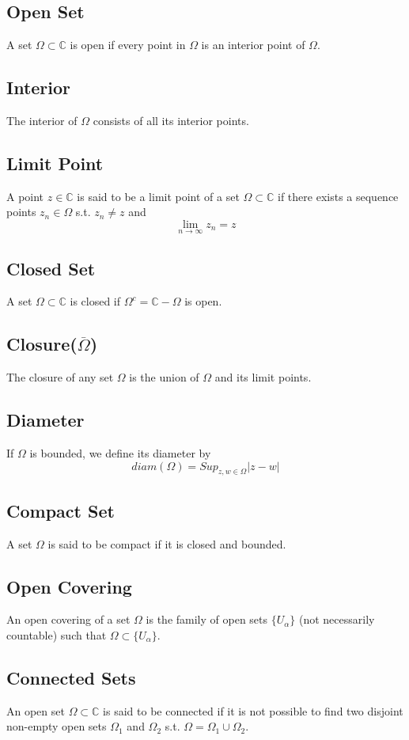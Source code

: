 \documentclass{article}
\begin{document}
\subsection{Open Set}
A set $\Omega \subset \mathbb{C}$ is open if every point in $\Omega$ is an interior point of $\Omega$.
\subsection{Interior}
The interior of $\Omega$ consists of all its interior points.
\subsection{Limit Point}
A point $z \in \mathbb{C}$ is said to be a limit point of a set $\Omega \subset \mathbb{C}$ if there exists a sequence points $z_n \in \Omega$ s.t. $z_n \neq z$ and 
\[
\lim_{n \to \infty} z_n=z
\]
\subsection{Closed Set}
A set $\Omega \subset \mathbb{C}$ is closed if $\Omega^c=\mathbb{C}-\Omega$ is open.
\subsection{Closure($\overline{\Omega}$)}
The closure of any set $\Omega$ is the union of $\Omega$ and its limit points.
\subsection{Diameter}
If $\Omega$ is bounded, we define its diameter by
\\
\[
diam(\Omega)=Sup_{z,w \in \Omega}|z-w|
\]
\subsection{Compact Set}
A set $\Omega$ is said to be compact if it is closed and bounded.
\subsection{Open Covering}
An open covering of a set $\Omega$ is the family of open sets $\{U_\alpha\}$ (not necessarily countable) such that $\Omega \subset \{U_\alpha\}$.
\subsection{Connected Sets}
An open set $\Omega \subset \mathbb{C}$ is said to be connected if it is not possible to find two disjoint non-empty open sets $\Omega_1$ and $\Omega_2$ s.t.
$\Omega=\Omega_1\cup \Omega_2$.
\end{document}
